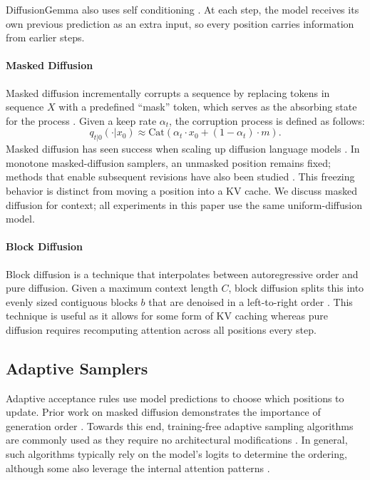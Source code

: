 DiffusionGemma also uses self conditioning \citep{chen2022analog}. At each step, the model receives its own previous prediction as an extra input, so every position carries information from earlier steps.

\paragraph{Masked Diffusion}
Masked diffusion incrementally corrupts a sequence by replacing tokens in sequence $X$ with a predefined ``mask'' token, which serves as the absorbing state for the process \citep{campbell2022continuous, sahoo2024simple, shi2024simplified}.
Given a keep rate $\alpha_t$, the corruption process is defined as follows:
\[
q_{t|0}(\cdot | x_0) \approx \text{Cat} \left( \alpha_t \cdot x_0 + (1 - \alpha_t) \cdot m\right).
\]
Masked diffusion has seen success when scaling up diffusion language models \citep{nie2026large, ye2025dream7bdiffusionlarge}.
In monotone masked-diffusion samplers, an unmasked position remains fixed; methods that enable subsequent revisions have also been studied \citep{kim2025fine}. This freezing behavior is distinct from moving a position into a KV cache. We discuss masked diffusion for context; all experiments in this paper use the same uniform-diffusion model.

\paragraph{Block Diffusion}
Block diffusion is a technique that interpolates between autoregressive order and pure diffusion. Given a maximum context length $C$, block diffusion splits this into evenly sized contiguous blocks $b$ that are denoised in a left-to-right order \citep{arriola2025blockdiffusioninterpolatingautoregressive, deschenaux2026blockgen}.
This technique is useful as it allows for some form of KV caching whereas pure diffusion requires recomputing attention across all positions every step.

\subsection{Adaptive Samplers}
Adaptive acceptance rules use model predictions to choose which positions to update. Prior work on masked diffusion demonstrates the importance of generation order \citep{kim2025train}.
Towards this end, training-free adaptive sampling algorithms are commonly used as they require no architectural modifications \citep{nie2026large, ye2025dream7bdiffusionlarge}.
In general, such algorithms typically rely on the model's logits to determine the ordering, although some also leverage the internal attention patterns \citep{kim2026klass, wu2026fast}.

